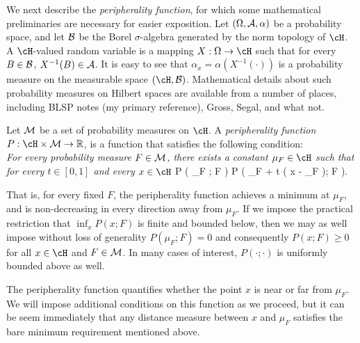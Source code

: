 \documentclass[fleqn,11pt]{article}
\begin{document}
We next describe the {\it peripherality function}, for which some mathematical 
preliminaries are necessary for easier exposition. Let $(\Omega, {\cal{A}}, \alpha)$ 
be a probability space, and let ${\cal{B}}$ be the Borel $\sigma$-algebra generated 
by the norm topology of $\cH$. A $\cH$-valued random variable is a mapping 
$X :  \Omega \rightarrow \cH$ such that for every $B \in {\cal{B}}$, $X^{-1} (B) \in {\cal{A}}$. 
It is easy to see that $\alpha_{x} = \alpha ( X^{-1} (\cdot ) )$ is a probability 
measure on the measurable space $(\cH, \cB)$. Mathematical details about 
such probability measures on Hilbert spaces are available from a number of 
places, including
\bredbf
BLSP notes (my primary reference), Gross, Segal, and what not.
\eredbf


Let ${\cal{M}}$ be a set of probability measures on $\cH$. 
A {\it peripherality function} 
$ P : \cH \times \cM \rightarrow \BR$,  is a function that satisfies the following 
condition:\\
{\it For every probability measure $F \in {\cal{M}}$, there exists a constant $\mu_{F} \in \cH$ 
such that for every $t \in [ 0, 1]$ and every $x \in \cH$}
\ban 
P \Bigl( \mu_{F} ; F \Bigr) \leq P \Bigl( \mu_{F} + t ( x - \mu_{F} ); F \Bigr). 
\ean 


That is, for every fixed $F$, the peripherality function achieves a minimum at 
$\mu_{F}$, and is non-decreasing in every direction away from $\mu_{F}$. If 
we impose the practical restriction that $\inf_{x} P ( x ; F )$ is finite and 
bounded below, then we may as well impose without loss of generality 
$P ( \mu_{F} ; F ) = 0$ and consequently $P ( x ; F ) \geq 0$ for all $x \in \cH$ 
and  $F \in {\cal{M}}$. In many cases of interest, $P ( \cdot; \cdot)$ is 
uniformly bounded above as well.


The peripherality function quantifies whether the point $x$ is near or far from $\mu_{F}$. 
We will impose additional conditions on this function 
as we proceed, but it can be seem immediately that any distance measure between 
$x$ and $\mu_{F}$ satisfies the bare minimum requirement mentioned above. 
\end{document}
